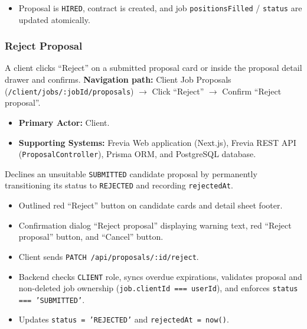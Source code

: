 \begin{itemize}[leftmargin=1.6em,topsep=3pt,itemsep=2pt,parsep=0pt,label=$\bullet$]
    \item Proposal is \texttt{HIRED}, contract is created, and job \texttt{positionsFilled} / \texttt{status} are updated atomically.
\end{itemize}

\subsubsection{Reject Proposal}

A client clicks ``Reject'' on a submitted proposal card or inside the proposal detail drawer and confirms.\newline
\textbf{Navigation path:} Client Job Proposals (\texttt{/client/jobs/:jobId/proposals}) $\rightarrow$ Click ``Reject'' $\rightarrow$ Confirm ``Reject proposal''.


\begin{itemize}[leftmargin=1.6em,topsep=3pt,itemsep=2pt,parsep=0pt,label=$\bullet$]
    \item \textbf{Primary Actor:} Client.
    \item \textbf{Supporting Systems:} Frevia Web application (Next.js), Frevia REST API (\texttt{ProposalController}), Prisma ORM, and PostgreSQL database.
\end{itemize}

\noindent Declines an unsuitable \texttt{SUBMITTED} candidate proposal by permanently transitioning its status to \texttt{REJECTED} and recording \texttt{rejectedAt}.

\begin{itemize}[leftmargin=1.6em,topsep=3pt,itemsep=2pt,parsep=0pt,label=$\bullet$]
    \item Outlined red ``Reject'' button on candidate cards and detail sheet footer.
    \item Confirmation dialog ``Reject proposal'' displaying warning text, red ``Reject proposal'' button, and ``Cancel'' button.
\end{itemize}

\begin{itemize}[leftmargin=1.6em,topsep=3pt,itemsep=2pt,parsep=0pt,label=$\bullet$]
    \item Client sends \texttt{PATCH /api/proposals/:id/reject}.
    \item Backend checks \texttt{CLIENT} role, syncs overdue expirations, validates proposal and non-deleted job ownership (\texttt{job.clientId === userId}), and enforces \texttt{status === 'SUBMITTED'}.
    \item Updates \texttt{status = 'REJECTED'} and \texttt{rejectedAt = now()}.
\end{itemize}

